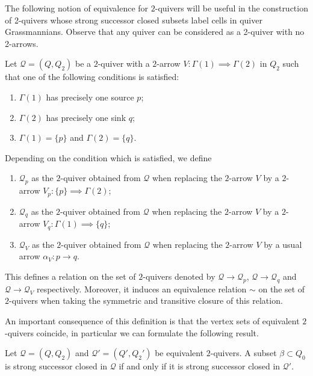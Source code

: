 \documentclass[smallextended,envcountsect,envcountsame]{svjour3}
\numberwithin{equation}{section}
\newcommand{\cQ}{\mathcal{Q}}
\begin{document}
The following notion of equivalence for $2$-quivers will be useful in the construction of 2-quivers whose strong successor closed subsets label cells in quiver Grassmannians.
Observe that any quiver can be considered as a 2-quiver with no 2-arrows.
\begin{definition}
  \label{def:2equivalence}
  Let $\cQ=(Q,Q_2)$ be a $2$-quiver with a $2$-arrow $V:\Gamma(1)\implies\Gamma(2)$ in $Q_2$ such that one of the following conditions is satisfied:
  \begin{enumerate}
    \item $\Gamma(1)$ has precisely one source $p$; 
    \item $\Gamma(2)$ has precisely one sink $q$;
    \item $\Gamma(1)=\{p\}$ and $\Gamma(2)=\{q\}$.
  \end{enumerate}
  Depending on the condition which is satisfied, we define
  \begin{enumerate}
    \item $\cQ_p$ as the $2$-quiver obtained from $\cQ$ when replacing the $2$-arrow $V$ by a $2$-arrow $V_p:\{p\}\implies\Gamma(2)$;
    \item $\cQ_q$ as the $2$-quiver obtained from $\cQ$ when replacing the $2$-arrow $V$ by a $2$-arrow $V_q:\Gamma(1)\implies\{q\}$;
    \item $\cQ_V$ as the $2$-quiver obtained from $\cQ$ when replacing the $2$-arrow $V$ by a usual arrow $\alpha_V:p\to q$. 
  \end{enumerate}
  This defines a relation on the set of $2$-quivers denoted by $\cQ\to\cQ_p$, $\cQ\to\cQ_q$ and $\cQ\to\cQ_V$ respectively.
  Moreover, it induces an equivalence relation $\sim$ on the set of $2$-quivers when taking the symmetric and transitive closure of this relation. 
\end{definition}

An important consequence of this definition is that the vertex sets of equivalent $2$-quivers coincide, in particular we can formulate the following result.
\begin{lemma}
  \label{lem:2equivalence}
  Let $\cQ=(Q,Q_2)$ and $\cQ'=(Q',Q_2')$ be equivalent $2$-quivers.
  A subset $\beta\subset Q_0$ is strong successor closed in $\cQ$ if and only if it is strong successor closed in $\cQ'$.
\end{lemma}
\end{document}
